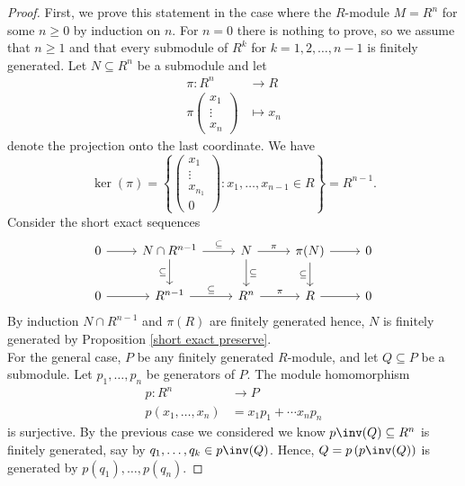 \documentclass[12pt, a4paper]{article}
\begin{document}
\begin{proof}
    First, we prove this statement in the case where the \(R\)-module \(M = R^n\) for some \(n \geq 0\) by induction on \(n\). For \(n=0\) there is nothing to prove, so we assume that \(n\geq 1\) and that every submodule of \(R^{k}\) for \(k=1,2,\ldots,n-1\) is finitely generated. Let \(N \subseteq R^n\) be a submodule and let
    \[\begin{aligned}
        \pi:R^n &\to R \\
        \pi\begin{pmatrix} x_1 \\ \vdots \\ x_n \end{pmatrix} &\mapsto x_n
    \end{aligned}\]
    denote the projection onto the last coordinate. We have
    \[\ker(\pi) = \left\{ \begin{pmatrix} x_1 \\\vdots\\ x_{n_1}\\0  \end{pmatrix} : x_1,\ldots,x_{n-1} \in R\right\} =R^{n-1}.\]
    Consider the short exact sequences
    \[\begin{tikzcd}
        0 \arrow[r] & N\cap R^{n-1} \arrow[r, "\subseteq"] \arrow[d, "\subseteq"'] & N \arrow[r, "\pi"] \arrow[d, "\subseteq"] & \pi(N) \arrow[r] \arrow[d, "\subseteq"'] & 0 \\
        0 \arrow[r] & R^{n-1} \arrow[r, "\subseteq"] & R^n \arrow[r, "\pi"] & R \arrow[r] & 0
        \end{tikzcd}\]
    By induction \(N \cap R^{n-1}\) and \(\pi(R)\) are finitely generated hence, \(N\) is finitely generated by Proposition \ref{short exact preserve}. \\
    For the general case, \(P\) be any finitely generated \(R\)-module, and let \(Q \subseteq P\) be a submodule. Let \(p_1,\ldots,p_n\) be generators of \(P\). The module homomorphism
    \[\begin{aligned}
        p:R^n &\to P \\
        p(x_1,\ldots,x_n)&=x_1p_1+\cdots x_np_n
    \end{aligned}\]
    is surjective. By the previous case we considered we know \(p\inv(Q) \subseteq R^n\) is finitely generated, say by \(q_1,\ldots,q_k \in p\inv(Q)\). Hence, \(Q = p\left( p\inv(Q) \right)\) is generated by \(p(q_1),\ldots,p(q_n)\).
\end{proof}
\end{document}
